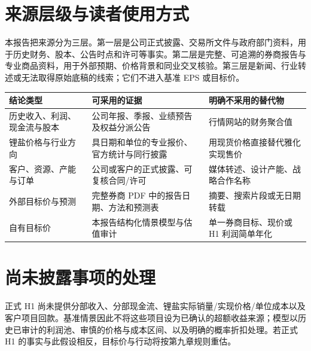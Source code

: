 \section{来源层级与读者使用方式}

本报告把来源分为三层。第一层是公司正式披露、交易所文件与政府部门资料，用于历史财务、股本、公告时点和许可等事实。第二层是完整、可追溯的券商报告与专业商品资料，用于外部预期、价格背景和同业交叉核验。第三层是新闻、行业转述或无法取得原始底稿的线索；它们不进入基准 EPS 或目标价。

\begin{exhibitbox}[表 A-1：关键结论的证据权限]
\begin{tabularx}{\exhibitboxwidth}{L{3.0cm}X X}
\toprule
结论类型 & 可采用的证据 & 明确不采用的替代物 \\
\midrule
历史收入、利润、现金流与股本 & 公司年报、季报、业绩预告及权益分派公告 & 行情网站的财务聚合值 \\
锂盐价格与行业方向 & 具日期和单位的专业报价、官方统计与同行披露 & 用现货价格直接替代雅化实现售价 \\
客户、资源、产能与订单 & 公司或客户的正式披露、可复核合同/许可 & 媒体转述、设计产能、战略合作名称 \\
外部目标价与预测 & 完整券商 PDF 中的报告日期、方法和预测表 & 摘要、搜索片段或无日期转载 \\
自有目标价 & 本报告结构化情景模型与估值审计 & 单一券商目标、现价或 H1 利润简单年化 \\
\bottomrule
\end{tabularx}
\end{exhibitbox}


\section{尚未披露事项的处理}

正式 H1 尚未提供分部收入、分部现金流、锂盐实际销量/实现价格/单位成本以及客户项目回款。基准情景因此不将这些项目设为已确认的超额收益来源；模型以历史已审计的利润池、审慎的价格与成本区间、以及明确的概率折扣处理。若正式 H1 的事实与此假设相反，目标价与行动将按第九章规则重估。
